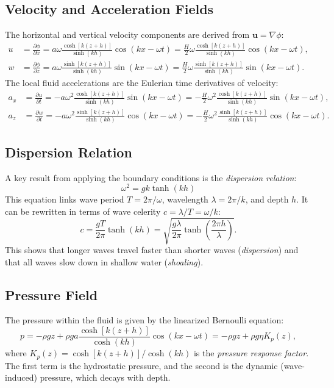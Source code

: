 \documentclass[11pt,letterpaper]{article}
\begin{document}
\subsection{Velocity and Acceleration Fields}
The horizontal and vertical velocity components are derived from $\mathbf{u} = \nabla \phi$:
\begin{align}
u &= \frac{\partial \phi}{\partial x} = a\omega \frac{\cosh[k(z+h)]}{\sinh(kh)} \cos(kx - \omega t) = \frac{H}{2}\omega \frac{\cosh[k(z+h)]}{\sinh(kh)} \cos(kx - \omega t), \\
w &= \frac{\partial \phi}{\partial z} = a\omega \frac{\sinh[k(z+h)]}{\sinh(kh)} \sin(kx - \omega t) = \frac{H}{2}\omega \frac{\sinh[k(z+h)]}{\sinh(kh)} \sin(kx - \omega t).
\end{align}
The local fluid accelerations are the Eulerian time derivatives of velocity:
\begin{align}
a_x &= \frac{\partial u}{\partial t} = -a\omega^2 \frac{\cosh[k(z+h)]}{\sinh(kh)} \sin(kx - \omega t) = -\frac{H}{2}\omega^2 \frac{\cosh[k(z+h)]}{\sinh(kh)} \sin(kx - \omega t), \\
a_z &= \frac{\partial w}{\partial t} = -a\omega^2 \frac{\sinh[k(z+h)]}{\sinh(kh)} \cos(kx - \omega t) = -\frac{H}{2}\omega^2 \frac{\sinh[k(z+h)]}{\sinh(kh)} \cos(kx - \omega t).
\end{align}


\subsection{Dispersion Relation}
A key result from applying the boundary conditions is the \emph{dispersion relation}:
\begin{equation}
\omega^2 = gk \tanh(kh)
\label{eq:dispersion}
\end{equation}
This equation links wave period $T = 2\pi/\omega$, wavelength $\lambda = 2\pi/k$, and depth $h$. It can be rewritten in terms of wave celerity $c = \lambda/T = \omega/k$:
\begin{equation}
c = \frac{gT}{2\pi} \tanh(kh) = \sqrt{\frac{g\lambda}{2\pi} \tanh\left(\frac{2\pi h}{\lambda}\right)}.
\end{equation}
This shows that longer waves travel faster than shorter waves (\emph{dispersion}) and that all waves slow down in shallow water (\emph{shoaling}).

\subsection{Pressure Field}
The pressure within the fluid is given by the linearized Bernoulli equation:
\begin{equation}
p = -\rho g z + \rho g a \frac{\cosh[k(z+h)]}{\cosh(kh)} \cos(kx - \omega t) = -\rho g z + \rho g \eta K_p(z),
\label{eq:airypressure}
\end{equation}
where $K_p(z) = \cosh[k(z+h)] / \cosh(kh)$ is the \emph{pressure response factor}. The first term is the hydrostatic pressure, and the second is the dynamic (wave-induced) pressure, which decays with depth.
\end{document}

